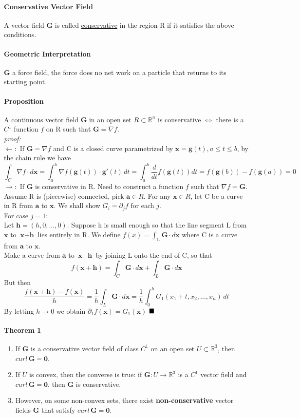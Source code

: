 \documentclass[11pt]{article}
\newcommand{\tb}[1]{\textbf{#1}}
\newcommand{\real}[0]{\mathbb{R}}
\newcommand{\under}[1]{\underline{#1}}
\newcommand{\proof}[0]{\textit{\underline{proof:} }}
\newcommand{\vx}[0]{\tb{x}}
\newcommand{\vo}[0]{\tb{0}}
\newcommand{\va}[0]{\tb{a}}
\newcommand{\vg}[0]{\tb{G}}
\newcommand{\qed}[0]{$\hfill\blacksquare$}
\begin{document}
\paragraph{Conservative Vector Field} A vector field $\vg$ is called \under{conservative} in the region R if it satisfies the above conditions.
\paragraph{Geometric Interpretation} $\vg$ a force field, the force does no net work on a particle that returns to its starting point.

\paragraph{Proposition} A continuous vector field $\vg$ in an open set $R \subset \real^n$ is conservative $\iff$ there is a $C^1$ function $f$ on R such that $\vg = \nabla f$.\\
\proof \\
$\leftarrow:$ If $\vg = \nabla f$ and C is a closed curve parametrized by $\vx = \tb{g}(t), a\leq t\leq b$, by the chain rule we have 
$$\int_C \nabla f \cdot d\vx = \int_a^b \nabla f(\tb{g}(t))\cdot \tb{g}'(t)\,dt = \int_a^b \frac{d}{dt}f(\tb{g}(t))dt = f(\tb{g}(b)) - f(\tb{g}(a)) = 0$$
$\rightarrow:$ If $\vg$ is conservative in R. Need to construct a function $f$ such that $\nabla f = \vg$. Assume R is (piecewise) connected, pick $\va \in R$. For any $\vx \in R$, let C be a curve in R from $\va$ to $\vx$. We shall show $G_i = \partial_j f$ for each $j$.\\
For case $j = 1$: \\
Let $\tb{h} = (h, 0, \hdots, 0)$. Suppose h is small enough so that the line segment L from $\vx$ to $\vx + \tb{h}$ lies entirely in R. We define $f(x) = \int_C \vg \cdot d\vx$ where C is a curve from $\va$ to $\vx$. \\
Make a curve from $\va$ to $\vx + \tb{h}$ by joining L onto the end of C, so that $$f(\vx + \tb{h}) = \int_C \vg \cdot d\vx + \int_L \vg \cdot d\vx$$But then
$$\frac{f(\vx+\tb{h}) - f(\vx)}{h} = \frac{1}{h}\int_L \vg \cdot d\vx = \frac{1}{h} \int_0^h G_1(x_1+t,x_2,\hdots,x_n)\,dt$$
By letting $h \rightarrow 0$ we obtain $\partial_1 f(\vx) = G_1(\vx)$
\qed
\paragraph{Theorem 1}
\begin{enumerate}
	\item If $\vg$ is a conservative vector field of class $C^1$ on an open set $U \subset \real^3$, then $curl \, \vg = \vo$.
	\item If $U$ is convex, then the converse is true: if $\vg: U \rightarrow \real^3$ is a $C^1$ vector field and $curl \, \vg = \vo$, then $\vg$ is conservative. 
	\item However, on some non-convex sets, there exist \tb{non-conservative} vector fields $\vg$ that satisfy $curl \, \vg = \vo$. 
\end{enumerate}
\end{document}
